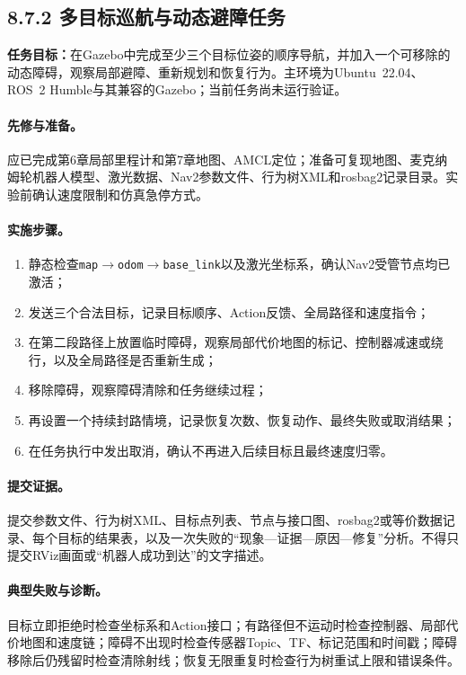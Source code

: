 \documentclass[UTF8,zihao=-4]{ctexart}
\begin{document}
\subsection*{8.7.2 多目标巡航与动态避障任务}

\noindent\textbf{任务目标：}在Gazebo中完成至少三个目标位姿的顺序导航，并加入一个可移除的动态障碍，观察局部避障、重新规划和恢复行为。主环境为Ubuntu~22.04、ROS~2 Humble与其兼容的Gazebo；当前任务尚未运行验证。

\paragraph{先修与准备。}
应已完成第6章局部里程计和第7章地图、AMCL定位；准备可复现地图、麦克纳姆轮机器人模型、激光数据、Nav2参数文件、行为树XML和rosbag2记录目录。实验前确认速度限制和仿真急停方式。

\paragraph{实施步骤。}
\begin{enumerate}
  \item 静态检查\texttt{map}$\rightarrow$\texttt{odom}$\rightarrow$\texttt{base\_link}以及激光坐标系，确认Nav2受管节点均已激活；
  \item 发送三个合法目标，记录目标顺序、Action反馈、全局路径和速度指令；
  \item 在第二段路径上放置临时障碍，观察局部代价地图的标记、控制器减速或绕行，以及全局路径是否重新生成；
  \item 移除障碍，观察障碍清除和任务继续过程；
  \item 再设置一个持续封路情境，记录恢复次数、恢复动作、最终失败或取消结果；
  \item 在任务执行中发出取消，确认不再进入后续目标且最终速度归零。
\end{enumerate}

\paragraph{提交证据。}
提交参数文件、行为树XML、目标点列表、节点与接口图、rosbag2或等价数据记录、每个目标的结果表，以及一次失败的“现象---证据---原因---修复”分析。不得只提交RViz画面或“机器人成功到达”的文字描述。

\paragraph{典型失败与诊断。}
目标立即拒绝时检查坐标系和Action接口；有路径但不运动时检查控制器、局部代价地图和速度链；障碍不出现时检查传感器Topic、TF、标记范围和时间戳；障碍移除后仍残留时检查清除射线；恢复无限重复时检查行为树重试上限和错误条件。
\end{document}

